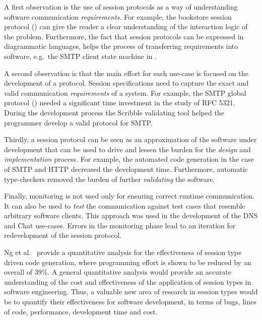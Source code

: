 A first observation is the use of session protocols
as a way of understanding software communication
{\em requirements}. For example, the bookstore
session protocol () can give
the reader a clear understanding of the interaction logic of
the problem. Furthermore, the fact that session protocols
can be expressed in diagrammatic languages, helps
the process of transferring requirements into software,
e.g.~the SMTP client state machine in .

A second observation is that the main effort for each use-case
is focused on the development of a protocol.
Session specifications need to capture the exact
and valid communication {\em requirements} of a system.
For example, the SMTP global protocol () %
needed a significant time investment in the study of RFC 5321. %
During the development process the Scribble validating tool
helped the programmer develop a valid protocol for SMTP.

Thirdly, a session protocol can be seen as an approximation
of the software under development that can be used to drive
and lessen the burden for the {\em design} and {\em implementation} process.
For example, the automated code generation in the case of
SMTP and HTTP decreased the development time. Furthermore,
automatic type-checkers removed the burden of further
{\em validating} the software.

Finally, monitoring is not used only for ensuring
correct runtime communication.
It can also be used to {\em test} the communication
against test cases that resemble arbitrary software clients.
This approach was used in the development of the DNS and
Chat use-cases. Errors in the monitoring phase
lead to an iteration for redevelopment of the session protocol.


Ng et al.~\cite{NCY2015} provide a quantitative analysis
for the effectiveness of session type driven code generation,
where programming effort is shown to be reduced by an overall of 39\%.
A general quantitative analysis would provide an accurate understanding of the cost and effectiveness of the application of session types in software engineering.
Thus, a valuable new area of research in session types would
be to quantify their effectiveness for software development,
in terms of bugs, lines of code, performance, development time and cost.

